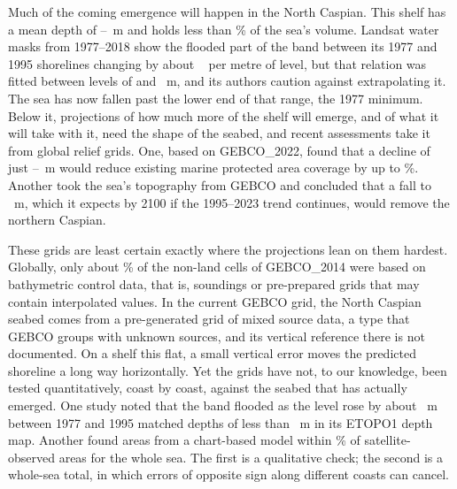 Much of the coming emergence will happen in the North Caspian. This shelf has a mean depth of --~m and holds less than \% of the sea's volume\citep{akbari2020}. Landsat water masks from 1977--2018 show the flooded part of the band between its 1977 and 1995 shorelines changing by about ~\kmsq{} per metre of level, but that relation was fitted between levels of  and ~m, and its authors caution against extrapolating it\citep{akbari2020}. The sea has now fallen past the lower end of that range, the 1977 minimum. Below it, projections of how much more of the shelf will emerge, and of what it will take with it, need the shape of the seabed, and recent assessments take it from global relief grids. One, based on GEBCO\_2022, found that a decline of just --~m would reduce existing marine protected area coverage by up to \%\citep{court2025}. Another took the sea's topography from GEBCO and concluded that a fall to ~m, which it expects by 2100 if the 1995--2023 trend continues, would remove the northern Caspian\citep{duan2025}.

These grids are least certain exactly where the projections lean on them hardest. Globally, only about \% of the non-land cells of GEBCO\_2014 were based on bathymetric control data, that is, soundings or pre-prepared grids that may contain interpolated values\citep{weatherall2015}. In the current GEBCO grid, the North Caspian seabed comes from a pre-generated grid of mixed source data, a type that GEBCO groups with unknown sources, and its vertical reference there is not documented\citep{gebco2026}. On a shelf this flat, a small vertical error moves the predicted shoreline a long way horizontally. Yet the grids have not, to our knowledge, been tested quantitatively, coast by coast, against the seabed that has actually emerged. One study noted that the band flooded as the level rose by about ~m between 1977 and 1995 matched depths of less than ~m in its ETOPO1 depth map\citep{akbari2020}. Another found areas from a chart-based model within \% of satellite-observed areas for the whole sea\citep{bocharov2026}. The first is a qualitative check; the second is a whole-sea total, in which errors of opposite sign along different coasts can cancel.

